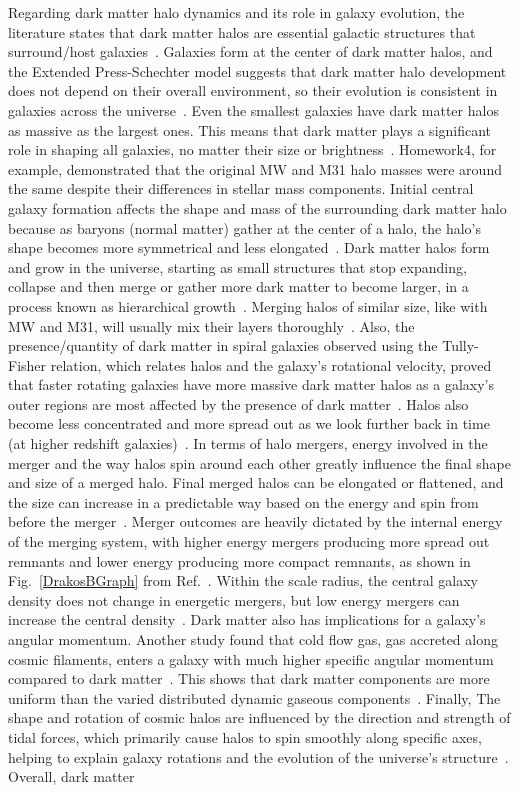 \documentclass[linenumbers,trackchanges]{aastex7}
\begin{document}
Regarding dark matter halo dynamics and its role in galaxy evolution, the literature states that dark matter halos are essential galactic structures that surround/host galaxies~\citep{Dubinski1992ApJ401}. Galaxies form at the center of dark matter halos, and the Extended Press-Schechter model suggests that dark matter halo development does not depend on their overall environment, so their evolution is consistent in galaxies across the universe~\citep{Frenk2012}. Even the smallest galaxies have dark matter halos as massive as the largest ones. This means that dark matter plays a significant role in shaping all galaxies, no matter their size or brightness~\citep{Wolf2010}. Homework4, for example, demonstrated that the original MW and M31 halo masses were around the same despite their differences in stellar mass components. Initial central galaxy formation affects the shape and mass of the surrounding dark matter halo because as baryons (normal matter) gather at the center of a halo, the halo’s shape becomes more symmetrical and less elongated~\citep{Abadi2010}. Dark matter halos form and grow in the universe, starting as small structures that stop expanding, collapse and then merge or gather more dark matter to become larger, in a process known as hierarchical growth~\citep{Frenk2012}. Merging halos of similar size, like with MW and M31, will usually mix their layers thoroughly~\citep{Frenk2012}. Also, the presence/quantity of dark matter in spiral galaxies observed using the Tully-Fisher relation, which relates halos and the galaxy’s rotational velocity,  proved that faster rotating galaxies have more massive dark matter halos as a galaxy’s outer regions are most affected by the presence of dark matter~\citep{Frenk2012}. Halos also become less concentrated and more spread out as we look further back in time (at higher redshift galaxies)~\citep{Bullock2001}. In terms of halo mergers, energy involved in the merger and the way halos spin around each other greatly influence the final shape and size of a merged halo. Final merged halos can be elongated or flattened, and the size can increase in a predictable way based on the energy and spin from before the merger~\citep{Drakos2019A}. Merger outcomes are heavily dictated by the internal energy of the merging system, with higher energy mergers producing more spread out remnants and lower energy producing more compact remnants, as shown in Fig.~\ref{DrakosBGraph} from Ref.~\citep{Drakos2019B}. Within the scale radius, the central galaxy density does not change in energetic mergers, but low energy mergers can increase the central density~\citep{Drakos2019B}. Dark matter also has implications for a galaxy’s angular momentum. Another study found that cold flow gas, gas accreted along cosmic filaments, enters a galaxy with much higher specific angular momentum compared to dark matter~\citep{Stewart2013}. This shows that dark matter components are more uniform than the varied distributed dynamic gaseous components~\citep{Stewart2013}. Finally, The shape and rotation of cosmic halos are influenced by the direction and strength of tidal forces, which primarily cause halos to spin smoothly along specific axes, helping to explain galaxy rotations and the evolution of the universe's structure~\citep{Dubinski1992ApJ401}. Overall, dark matter 
\end{document}
